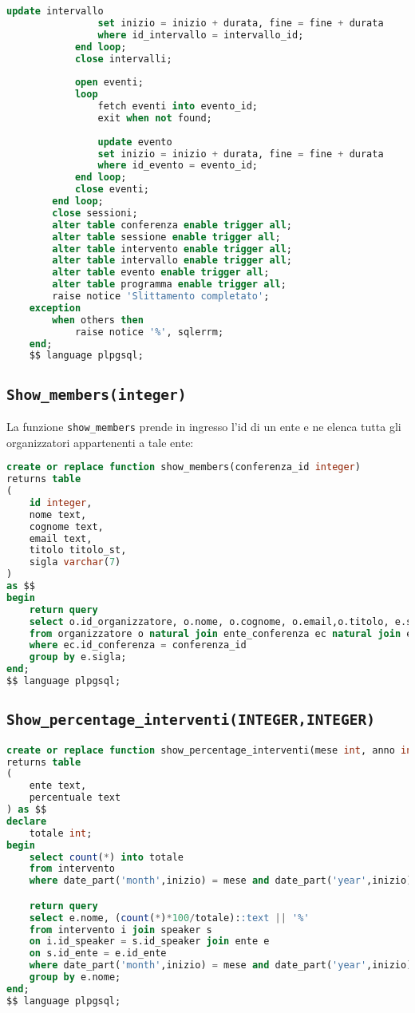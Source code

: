\begin{lstlisting}[language=SQL,style=mystyle]
				update intervallo
				set inizio = inizio + durata, fine = fine + durata
				where id_intervallo = intervallo_id;
			end loop;
			close intervalli;
			
			open eventi;
			loop
				fetch eventi into evento_id;
				exit when not found;
	
				update evento
				set inizio = inizio + durata, fine = fine + durata
				where id_evento = evento_id;
			end loop;
			close eventi;
		end loop;
		close sessioni;
        alter table conferenza enable trigger all;
        alter table sessione enable trigger all;
        alter table intervento enable trigger all;
        alter table intervallo enable trigger all;
        alter table evento enable trigger all;
        alter table programma enable trigger all;
        raise notice 'Slittamento completato';
	exception
		when others then
			raise notice '%', sqlerrm;
	end;
	$$ language plpgsql;
\end{lstlisting}

\subsection{\texttt{Show\_members(integer)}}
La funzione \texttt{show\_members} prende in ingresso l'id di un ente e ne elenca tutta gli organizzatori appartenenti a tale ente:
\begin{lstlisting}[language=SQL,style=mystyle]
create or replace function show_members(conferenza_id integer)
returns table 
(
    id integer, 
    nome text, 
    cognome text, 
    email text,
    titolo titolo_st, 
    sigla varchar(7)
) 
as $$
begin
    return query
    select o.id_organizzatore, o.nome, o.cognome, o.email,o.titolo, e.sigla
    from organizzatore o natural join ente_conferenza ec natural join ente e  
    where ec.id_conferenza = conferenza_id
    group by e.sigla;
end;
$$ language plpgsql;
\end{lstlisting}
\subsection{\texttt{Show\_percentage\_interventi(INTEGER,INTEGER)}}
\begin{lstlisting}[language=SQL,style=mystyle]
create or replace function show_percentage_interventi(mese int, anno int)
returns table
(
    ente text,
    percentuale text
) as $$
declare
    totale int;
begin
    select count(*) into totale
    from intervento
    where date_part('month',inizio) = mese and date_part('year',inizio) = anno;

    return query
    select e.nome, (count(*)*100/totale)::text || '%'
    from intervento i join speaker s 
    on i.id_speaker = s.id_speaker join ente e 
    on s.id_ente = e.id_ente
    where date_part('month',inizio) = mese and date_part('year',inizio) = anno
    group by e.nome;
end;
$$ language plpgsql;
\end{lstlisting}
